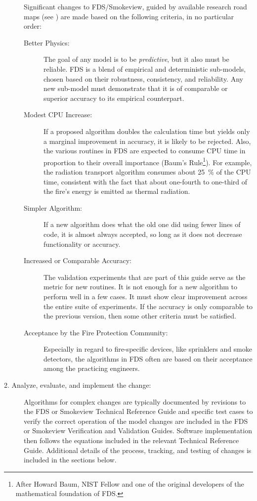 \documentclass[11pt]{book}
\begin{document}
\begin{description}
    Significant changes to FDS/Smokeview, guided by available research road maps \linebreak (see \href{https://pages.nist.gov/fds/} {}) are made based on the following criteria, in no particular order:
\begin{description}
\item[Better Physics:] The goal of any model is to be {\em predictive}, but it also must be reliable. FDS is a blend of empirical and deterministic sub-models, chosen based on their robustness, consistency, and reliability. Any new sub-model must demonstrate that it is of comparable or superior accuracy to its empirical counterpart.
\item[Modest CPU Increase:] If a proposed algorithm doubles the calculation time but yields only a marginal improvement in accuracy, it is likely to be rejected. Also, the various routines in FDS are expected to consume CPU time in proportion to their overall importance (Baum's Rule\footnote{After Howard Baum, NIST Fellow and one of the original developers of the mathematical foundation of FDS.}). For example, the radiation transport algorithm consumes about 25~\% of the CPU time, consistent with the fact that about one-fourth to one-third of the fire's energy is emitted as thermal radiation.
\item[Simpler Algorithm:] If a new algorithm does what the old one did using fewer lines of code, it is almost always accepted, so long as it does not decrease functionality or accuracy.
\item[Increased or Comparable Accuracy:] The validation experiments that are part of this guide serve as the metric for new routines. It is not enough for a new algorithm to perform well in a few cases. It must show clear improvement across the entire suite of experiments. If the accuracy is only comparable to the previous version, then some other criteria must be satisfied.
\item[Acceptance by the Fire Protection Community:] Especially in regard to fire-specific devices, like sprinklers and smoke detectors, the algorithms in FDS often are based on their acceptance among the practicing engineers.
\end{description}
\item [2. Analyze, evaluate, and implement the change:] Algorithms for complex changes are typically documented by revisions to the FDS or Smokeview Technical Reference Guide and specific test cases to verify the correct operation of the model changes are included in the FDS or Smokeview Verification and Validation Guides. Software implementation then follows the equations included in the relevant Technical Reference Guide. Additional details of the process, tracking, and testing of changes is included in the sections below.

\end{description}
\end{document}
